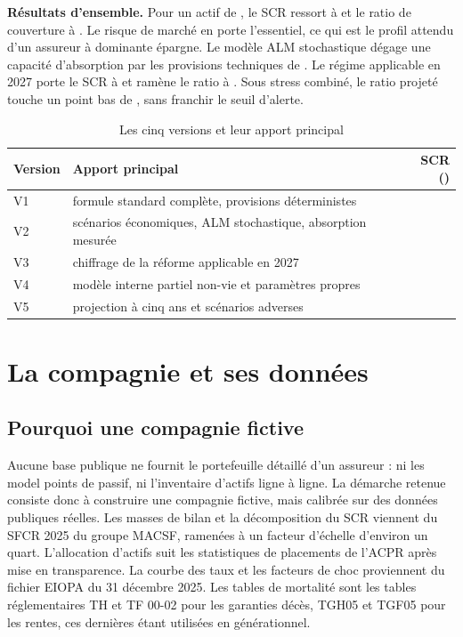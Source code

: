 \documentclass[11pt,a4paper]{article}
\newcommand{\Meuro}{\text{M\texteuro}}
\begin{document}
\begin{encadre}
\textbf{Résultats d'ensemble.} Pour un actif de \ActifTotal{} \Meuro{}, le SCR ressort à
\ScrVdeux{} \Meuro{} et le ratio de couverture à \RatioVdeux{}. Le risque de marché en porte
l'essentiel, ce qui est le profil attendu d'un assureur à dominante épargne. Le modèle ALM
stochastique dégage une capacité d'absorption par les provisions techniques de \LacTPVdeux{}
\Meuro{}. Le régime applicable en 2027 porte le SCR à \ScrReforme{} \Meuro{} et ramène le ratio à
\RatioReforme{}. Sous stress combiné, le ratio projeté touche un point bas de \RatioOrsaCrise{},
sans franchir le seuil d'alerte.
\end{encadre}

\begin{table}[H]\centering\small
\caption{Les cinq versions et leur apport principal}
\begin{tabularx}{\linewidth}{lXr}
\toprule
\textbf{Version} & \textbf{Apport principal} & \textbf{SCR (\Meuro{})}\\
\midrule
V1 & formule standard complète, provisions déterministes & \ScrVun{}\\
V2 & scénarios économiques, ALM stochastique, absorption mesurée & \ScrVdeux{}\\
V3 & chiffrage de la réforme applicable en 2027 & \ScrReforme{}\\
V4 & modèle interne partiel non-vie et paramètres propres & \ScrVdeux{}\\
V5 & projection à cinq ans et scénarios adverses & \\
\bottomrule
\end{tabularx}
\end{table}

\section{La compagnie et ses données}

\subsection{Pourquoi une compagnie fictive}

Aucune base publique ne fournit le portefeuille détaillé d'un assureur : ni les model points de
passif, ni l'inventaire d'actifs ligne à ligne. La démarche retenue consiste donc à construire une
compagnie fictive, mais calibrée sur des données publiques réelles. Les masses de bilan et la
décomposition du SCR viennent du SFCR 2025 du groupe MACSF, ramenées à un facteur d'échelle
d'environ un quart. L'allocation d'actifs suit les statistiques de placements de l'ACPR après mise
en transparence. La courbe des taux et les facteurs de choc proviennent du fichier EIOPA du
31 décembre 2025. Les tables de mortalité sont les tables réglementaires TH et TF 00-02 pour les
garanties décès, TGH05 et TGF05 pour les rentes, ces dernières étant utilisées en générationnel.
\end{document}
